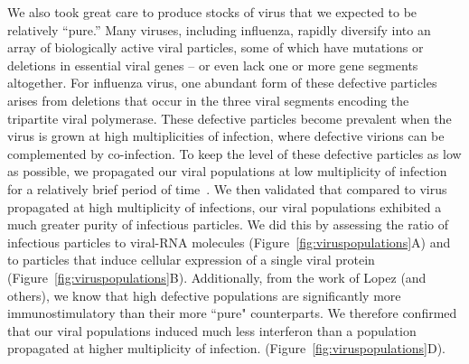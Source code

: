 \documentclass[9pt,lineno]{elife}
\begin{document}
We also took great care to produce stocks of virus that we expected to be relatively ``pure.''
Many viruses, including influenza, rapidly diversify into an array of biologically active viral particles, some of which have mutations or deletions in essential viral genes -- or even lack one or more gene segments altogether.
For influenza virus, one abundant form of these defective particles arises from deletions that occur in the three viral segments encoding the tripartite viral polymerase.
These defective particles become prevalent when the virus is grown at high multiplicities of infection, where defective virions can be complemented by co-infection.
To keep the level of these defective particles as low as possible, we propagated our viral populations at low multiplicity of infection for a relatively brief period of time~\citep{xue2016propagation}.
We then validated that compared to virus propagated at high multiplicity of infections, our viral populations exhibited a much greater purity of infectious particles.
We did this by assessing the ratio of infectious particles to viral-RNA molecules (Figure~\ref{fig:viruspopulations}A) and to particles that induce cellular expression of a single viral protein (Figure~\ref{fig:viruspopulations}B).
Additionally, from the work of Lopez (and others), we know that high defective populations are significantly more immunostimulatory than their more ``pure" counterparts.
We therefore confirmed that our viral populations induced much less interferon than a population propagated at higher multiplicity of infection. (Figure~\ref{fig:viruspopulations}D).
\end{document}

